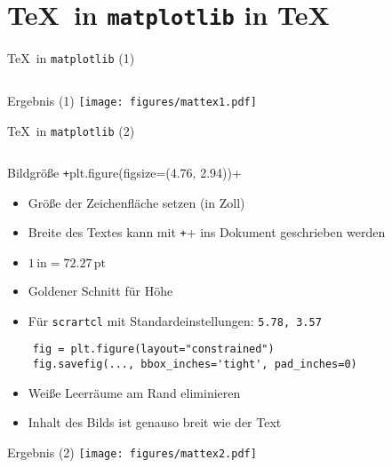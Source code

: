 \section{\TeX\ in \texttt{matplotlib} in \TeX}

\begin{frame}[fragile]{\TeX\ in \texttt{matplotlib} (1)}
  \inputminted{python}{script/mattex1.py}
\end{frame}

\AddToShipoutPictureFG*{\ShowFramePicture}
\begin{frame}{Ergebnis (1)}%
  \centering%
  \texttt{[image: figures/mattex1.pdf]}%
\end{frame}

\begin{frame}[fragile]{\TeX\ in \texttt{matplotlib} (2)}
  \inputminted{python}{script/mattex2.py}
\end{frame}

\begin{frame}[fragile]{Bildgröße}
  \texttt+plt.figure(figsize=(4.76, 2.94))+
  \begin{itemize}
    \item Größe der Zeichenfläche setzen (in Zoll)
    \item Breite des Textes kann mit \texttt+\the\textwidth+ ins Dokument geschrieben werden
    \item $1\,\mathrm{in} = \num{72.27}\,\mathrm{pt}$
    \item Goldener Schnitt für Höhe
    \item Für \texttt{scrartcl} mit Standardeinstellungen: \texttt{5.78, 3.57}
  \end{itemize}

  \begin{verbatim}
    fig = plt.figure(layout="constrained")
    fig.savefig(..., bbox_inches='tight', pad_inches=0)
  \end{verbatim}
  \begin{itemize}
    \item Weiße Leerräume am Rand eliminieren
    \item Inhalt des Bilds ist genauso breit wie der Text
  \end{itemize}
\end{frame}

\AddToShipoutPictureFG*{\ShowFramePicture}
\begin{frame}{Ergebnis (2)}%
  \centering%
  \texttt{[image: figures/mattex2.pdf]}%
\end{frame}

